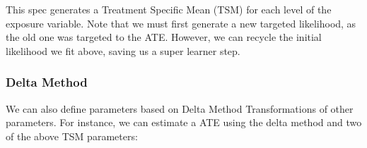 \documentclass[12pt, krantz2,]{krantz}
\newenvironment{Shaded}{\begin{snugshade}}{\end{snugshade}}
\newcommand{\DecValTok}[1]{\textcolor[rgb]{0.06,0.06,0.06}{#1}}
\newcommand{\KeywordTok}[1]{\textcolor[rgb]{0.27,0.27,0.27}{\textbf{#1}}}
\newcommand{\NormalTok}[1]{#1}
\newcommand{\OperatorTok}[1]{\textcolor[rgb]{0.43,0.43,0.43}{\textbf{#1}}}
\newcommand{\StringTok}[1]{\textcolor[rgb]{0.5,0.5,0.5}{#1}}
\theoremstyle{definition}
\theoremstyle{definition}
\theoremstyle{definition}
\newcommand{\1}{\mathbbm{1}}
\begin{document}
\begin{Shaded}
\end{Shaded}

This spec generates a Treatment Specific Mean (TSM) for each level of the
exposure variable. Note that we must first generate a new targeted likelihood,
as the old one was targeted to the ATE. However, we can recycle the initial
likelihood we fit above, saving us a super learner step.

\hypertarget{delta-method}{%
\subsubsection{Delta Method}\label{delta-method}}

We can also define parameters based on Delta Method Transformations of other
parameters. For instance, we can estimate a ATE using the delta method and two
of the above TSM parameters:
\end{document}
